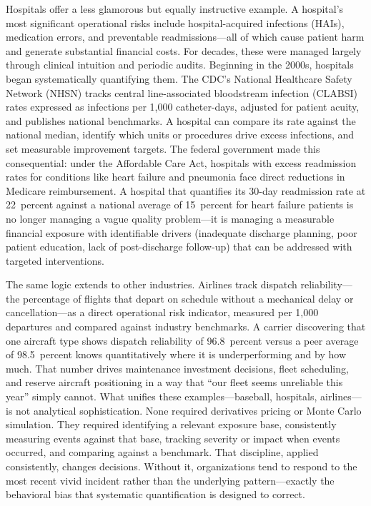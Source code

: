 \documentclass[11pt,openany]{book}
\begin{document}
Hospitals offer a less glamorous but equally instructive example. A hospital's
most significant operational risks include hospital-acquired infections (HAIs),
medication errors, and preventable readmissions---all of which cause patient
harm and generate substantial financial costs. For decades, these were managed
largely through clinical intuition and periodic audits. Beginning in the 2000s,
hospitals began systematically quantifying them. The CDC's National Healthcare
Safety Network (NHSN) tracks central line-associated bloodstream infection
(CLABSI) rates expressed as infections per 1,000 catheter-days, adjusted for
patient acuity, and publishes national benchmarks. A hospital can compare its
rate against the national median, identify which units or procedures drive
excess infections, and set measurable improvement targets. The federal
government made this consequential: under the Affordable Care Act, hospitals
with excess readmission rates for conditions like heart failure and pneumonia
face direct reductions in Medicare reimbursement. A hospital that quantifies
its 30-day readmission rate at 22~percent against a national average of
15~percent for heart failure patients is no longer managing a vague quality
problem---it is managing a measurable financial exposure with identifiable
drivers (inadequate discharge planning, poor patient education, lack of
post-discharge follow-up) that can be addressed with targeted interventions.

The same logic extends to other industries. Airlines track dispatch
reliability---the percentage of flights that depart on schedule without a
mechanical delay or cancellation---as a direct operational risk indicator,
measured per 1,000 departures and compared against industry benchmarks. A
carrier discovering that one aircraft type shows dispatch reliability of
96.8~percent versus a peer average of 98.5~percent knows quantitatively where
it is underperforming and by how much. That number drives maintenance
investment decisions, fleet scheduling, and reserve aircraft positioning in a
way that ``our fleet seems unreliable this year'' simply cannot. What unifies
these examples---baseball, hospitals, airlines---is not analytical
sophistication. None required derivatives pricing or Monte Carlo simulation.
They required identifying a relevant exposure base, consistently measuring
events against that base, tracking severity or impact when events occurred, and
comparing against a benchmark. That discipline, applied consistently, changes
decisions. Without it, organizations tend to respond to the most recent vivid
incident rather than the underlying pattern---exactly the behavioral bias that
systematic quantification is designed to correct.
\end{document}
